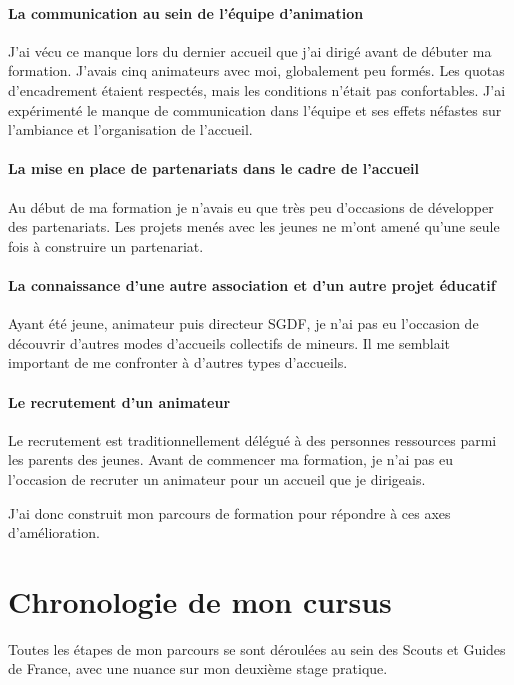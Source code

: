 \documentclass[titlepage,11pt,a4paper]{article}
\begin{document}
\paragraph{La communication au sein de l'équipe d'animation} J'ai vécu ce manque lors du
dernier accueil que j'ai dirigé avant de débuter ma formation. J'avais cinq animateurs avec moi,
globalement peu formés. Les quotas d'encadrement étaient respectés, mais les conditions
n'était pas confortables. J'ai expérimenté le manque de communication dans l'équipe et ses
effets néfastes sur l'ambiance et l'organisation de l'accueil.

\paragraph{La mise en place de partenariats dans le cadre de l'accueil} Au début de ma
formation je n'avais eu que très peu d'occasions de développer des partenariats. Les
projets menés avec les jeunes ne m'ont amené qu'une seule fois à construire un
partenariat.

\paragraph{La connaissance d'une autre association et d'un autre projet éducatif} Ayant
été jeune, animateur puis directeur SGDF, je n'ai pas eu l'occasion de découvrir d'autres
modes d'accueils collectifs de mineurs. Il me semblait important de me confronter à
d'autres types d'accueils.

\paragraph{Le recrutement d'un animateur} Le recrutement est traditionnellement délégué à
des personnes ressources parmi les parents des jeunes. Avant de commencer ma formation, je
n'ai pas eu l'occasion de recruter un animateur pour un accueil que je dirigeais.

J'ai donc construit mon parcours de formation pour répondre à ces axes d'amélioration.


\clearpage
\section{Chronologie de mon cursus}

Toutes les étapes de mon parcours se sont déroulées au sein des Scouts et Guides de
France, avec une nuance sur mon deuxième stage pratique.
\end{document}
